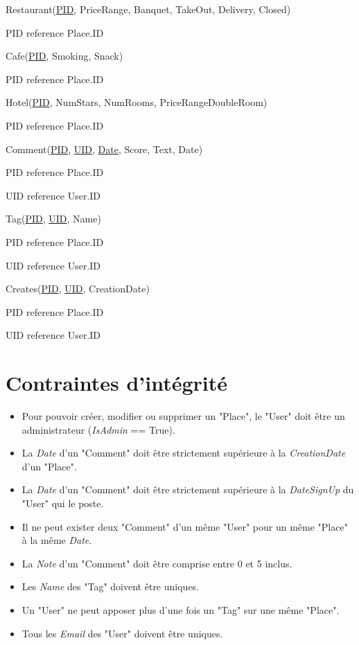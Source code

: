 \documentclass[a4paper,10pt]{article}
\begin{document}
\hspace{-0,5cm}Restaurant(\underline{PID}, PriceRange, Banquet, TakeOut, Delivery, Closed)

PID reference Place.ID

\hspace{-0,5cm}Cafe(\underline{PID}, Smoking, Snack)

PID reference Place.ID

\hspace{-0,5cm}Hotel(\underline{PID}, NumStars, NumRooms, PriceRangeDoubleRoom)

PID reference Place.ID

\hspace{-0,5cm}Comment(\underline{PID}, \underline{UID}, \underline{Date}, Score, Text, Date)

PID reference Place.ID

UID reference User.ID

\hspace{-0,5cm}Tag(\underline{PID}, \underline{UID}, Name)

PID reference Place.ID

UID reference User.ID

\hspace{-0,5cm}Creates(\underline{PID}, \underline{UID}, CreationDate)

PID reference Place.ID

UID reference User.ID



\section{Contraintes d'intégrité}

\begin{itemize}
  \item Pour pouvoir créer, modifier ou supprimer un "Place", le "User" doit être un administrateur (\emph{IsAdmin} == True).
  \item La \emph{Date} d'un "Comment" doit être strictement supérieure à la \emph{CreationDate} d'un "Place".
  \item La \emph{Date} d'un "Comment" doit être strictement supérieure à la \emph{DateSignUp} du "User" qui le poste.
  \item Il ne peut exister deux "Comment" d'un même "User" pour un même "Place" à la même \emph{Date}.
  \item La \emph{Note} d'un "Comment" doit être comprise entre 0 et 5 inclus.
  \item Les \emph{Name} des "Tag" doivent être uniques.
  \item Un "User" ne peut apposer plus d'une fois un "Tag" sur une même "Place".
  \item Tous les \emph{Email} des "User" doivent être uniques.
\end{itemize}
\end{document}
